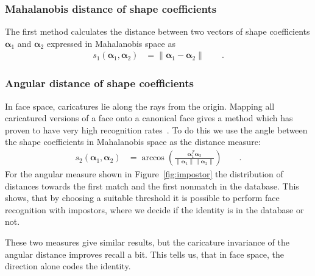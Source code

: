 \documentclass{vgtc}                          %
\newcommand*{\VEC}[1]  {\ensuremath{\bm{#1}}}
\newcommand*{\norm}[1]{\mathopen\| #1 \mathclose\|}%
\begin{document}
\subsubsection{Mahalanobis distance of shape coefficients}
The first method calculates the distance between two vectors of shape
coefficients $\VEC \alpha_1$ and $\VEC\alpha_2$ expressed in Mahalanobis space
as
\begin{align}
  s_1(\VEC\alpha_1, \VEC\alpha_2) &= \norm{\VEC\alpha_1 - \VEC\alpha_2}\qquad.
\end{align}

\subsubsection{Angular distance of shape coefficients}
In face space, caricatures lie along the rays from the origin.
Mapping all caricatured versions of a face onto a canonical face gives a method
which has proven to have very high recognition rates~\cite{blanz03:face_rec}.
To do this we use the angle between the shape coefficients in Mahalanobis space
as the distance measure:
\begin{align}
  s_2(\VEC\alpha_1, \VEC\alpha_2) &= \arccos\left(\frac{\VEC\alpha_1^T\VEC\alpha_2}{\norm{\VEC\alpha_1}\norm{\VEC\alpha_2}}\right)\qquad.
\end{align}
For the angular measure shown in Figure~\ref{fig:impostor} the distribution of
distances towards the first match and the first nonmatch in the database. This
shows, that by choosing a suitable threshold it is possible to perform face
recognition with impostors, where we decide if the identity is in the database
or not.

These two measures give similar results, but the caricature invariance of the
angular distance improves recall a bit. This tells us, that in face space, the
direction alone codes the identity.
\end{document}
